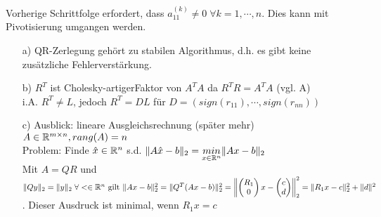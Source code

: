 \begin{Bemerkung}
	Vorherige Schrittfolge erfordert, dass $a_{11}^{(k)} \neq 0 \;\forall k=1,\cdots,n$.
	Dies kann mit Pivotisierung umgangen werden. 
\end{Bemerkung}\hfill
\begin{weitere Bemerkungen}\hfill
	\begin{itemize}
		\item[a)]QR-Zerlegung gehört zu \glqq stabilen Algorithmus\grqq, d.h. es gibt keine zusätzliche Fehlerverstärkung.
		\item[b)]$R^T$ ist \glqq Cholesky-artiger\grqq Faktor von $A^TA$ da $R^TR=A^TA$ (vgl. A)\\ i.A. $R^T \neq L$, jedoch $R^T=DL$ für $D=(sign(r_{11}),\cdots,sign(r_{nn}))$
		\item[c)]Ausblick: lineare Ausgleichsrechnung (später mehr)\\
		$A \in\mathbb R^{m\times n}, rang(A)=n$\\
		Problem: Finde $\hat{x} \in \mathbb R^n$ s.d. $\|A\hat{x}-b\|_2=\underset{x\in\mathbb R^n}{min}\|Ax-b\|_2$\\
		Mit $A=QR$ und $\|Qy\|_2=\|y\|_2 \;\forall < \in \mathbb R^n \text{ gilt }\\
      \|Ax-b\|_2^2=\|Q^T(Ax-b)\|_2^2=\left\|\begin{pmatrix}R_1\\0\end{pmatrix}x-\begin{pmatrix}c\\d\end{pmatrix}\right\|_2^2 = \|R_1x-c\|_2^2 + \|d\|^2$. Dieser Ausdruck ist minimal, wenn $R_1x=c$
	\end{itemize}
\end{weitere Bemerkungen}